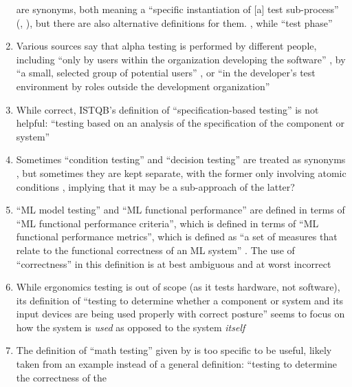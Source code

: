 \begin{enumerate}
            are synonyms, both meaning a ``specific instantiation of [a] test
            sub-process'' (\citeyear[pp.~469, 470]{IEEE2017},
            \citeyear[p.~9]{IEEE2013}), but there are also alternative
            definitions for them. \procLevel{\citeyearpar}, while
            ``test phase'' \phaseDef{}
      \item Various sources say that alpha testing is performed by different
            people, including ``only by users within the organization
            developing the software'' \citep[p.~17]{IEEE2017}, by ``a small,
            selected group of potential users'' \citep[p.~5-8]{SWEBOK2024}, or
            ``in the developer's test environment by roles outside the
            development organization'' 
      \item While correct, ISTQB's definition of ``specification-based testing''
            is not helpful: ``testing based on an analysis of the specification
            of the component or system'' 
      \item Sometimes ``condition testing'' and ``decision testing'' are treated
            as synonyms \citep[p.~5-13]{SWEBOK2024}, but sometimes they are kept
            separate, with the former only involving atomic conditions
            , implying that it may be a sub-approach of the
            latter?
      \item ``ML model testing'' and ``ML functional performance'' are defined
            in terms of ``ML functional performance criteria'', which is defined
            in terms of ``ML functional performance metrics'', which is defined
            as ``a set of measures that relate to the functional correctness of
            an ML system'' . The use of ``correctness'' in
            this definition is at best ambiguous and at worst incorrect
      \item While ergonomics testing is out of scope (as it tests hardware, not
            software), its definition of ``testing to determine whether a
            component or system and its input devices are being used properly
            with correct posture''  seems to focus on how the
            system is \emph{used} as opposed to the system \emph{itself}
      \item The definition of ``math testing'' given by  is
            too specific to be useful, likely taken from an example instead of
            a general definition: ``testing to determine the correctness of the

\end{enumerate}
